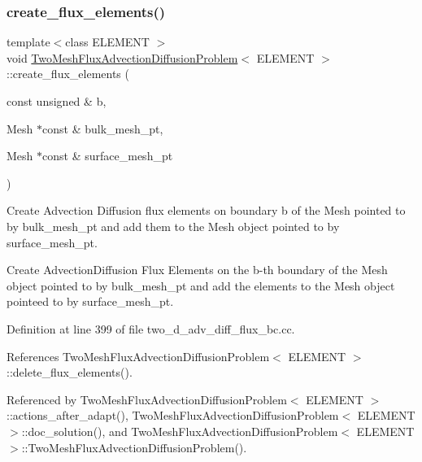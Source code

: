 \mbox{\label{classTwoMeshFluxAdvectionDiffusionProblem_af01824e72ea624e25854a62e0dbd4eb9}} 
\subsubsection{\texorpdfstring{create\+\_\+flux\+\_\+elements()}{create\_flux\_elements()}}
{\footnotesize\ttfamily template$<$class E\+L\+E\+M\+E\+NT $>$ \\
void \hyperlink{classTwoMeshFluxAdvectionDiffusionProblem}{Two\+Mesh\+Flux\+Advection\+Diffusion\+Problem}$<$ E\+L\+E\+M\+E\+NT $>$\+::create\+\_\+flux\+\_\+elements (\begin{DoxyParamCaption}\item[{const unsigned \&}]{b,  }\item[{Mesh $\ast$const \&}]{bulk\+\_\+mesh\+\_\+pt,  }\item[{Mesh $\ast$const \&}]{surface\+\_\+mesh\+\_\+pt }\end{DoxyParamCaption})\hspace{0.3cm}{\ttfamily [private]}}



Create Advection Diffusion flux elements on boundary b of the Mesh pointed to by bulk\+\_\+mesh\+\_\+pt and add them to the Mesh object pointed to by surface\+\_\+mesh\+\_\+pt. 

Create Advection\+Diffusion Flux Elements on the b-\/th boundary of the Mesh object pointed to by bulk\+\_\+mesh\+\_\+pt and add the elements to the Mesh object pointeed to by surface\+\_\+mesh\+\_\+pt. 

Definition at line 399 of file two\+\_\+d\+\_\+adv\+\_\+diff\+\_\+flux\+\_\+bc.\+cc.



References Two\+Mesh\+Flux\+Advection\+Diffusion\+Problem$<$ E\+L\+E\+M\+E\+N\+T $>$\+::delete\+\_\+flux\+\_\+elements().



Referenced by Two\+Mesh\+Flux\+Advection\+Diffusion\+Problem$<$ E\+L\+E\+M\+E\+N\+T $>$\+::actions\+\_\+after\+\_\+adapt(), Two\+Mesh\+Flux\+Advection\+Diffusion\+Problem$<$ E\+L\+E\+M\+E\+N\+T $>$\+::doc\+\_\+solution(), and Two\+Mesh\+Flux\+Advection\+Diffusion\+Problem$<$ E\+L\+E\+M\+E\+N\+T $>$\+::\+Two\+Mesh\+Flux\+Advection\+Diffusion\+Problem().

